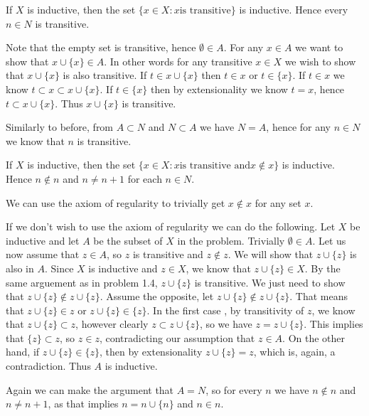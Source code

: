 \begin{problem}
  If $X$ is inductive, then the set $\{x \in X : x \text{is transitive}\}$ is inductive.
  Hence every $n \in N$ is transitive.
\end{problem}

\begin{solution}
  Note that the empty set is transitive, hence $\emptyset \in A$.
  For any $x \in A$ we want to show that $x \cup \{x\} \in A$.
  In other words for any transitive $x \in X$ we wish to show that $x \cup \{x\}$ is also transitive.
  If $t \in x \cup \{x\}$ then $t \in x$ or $t \in \{x\}$.
  If $t \in x$ we know $t \subset x \subset x \cup \{x\}$.
  If $t \in \{x\}$ then by extensionality we know $t = x$, hence $t \subset x \cup \{x\}$.
  Thus $x \cup \{x\}$ is transitive.

  Similarly to before, from $A \subset N$ and $N \subset A$ we have $N = A$, hence for any $n \in N$ we know that $n$ is transitive.
\end{solution}

\begin{problem}
  If $X$ is inductive, then the set $\{x \in X : x \text{is transitive and} x \notin x\}$ is inductive.
  Hence $n \notin n$ and $n \neq n + 1$ for each $n \in N$.
\end{problem}

\begin{solution}
  We can use the axiom of regularity to trivially get $x \notin x$ for any set $x$.

  If we don't wish to use the axiom of regularity we can do the following.
  Let $X$ be inductive and let $A$ be the subset of $X$ in the problem.
  Trivially $\emptyset \in A$.
  Let us now assume that $z \in A$, so $z$ is transitive and $z \notin z$.
  We will show that $z \cup \{z\}$ is also in $A$.
  Since $X$ is inductive and $z \in X$, we know that $z \cup \{z\} \in X$.
  By the same arguement as in problem 1.4, $z \cup \{z\}$ is transitive.
  We just need to show that $z \cup \{z\} \notin z \cup \{z\}$.
  Assume the opposite, let $z \cup \{z\} \notin z \cup \{z\}$.
  That means that $z \cup \{z\} \in z$ or $z \cup \{z\} \in \{z\}$.
  In the first case , by transitivity of $z$, we know that $z \cup \{z\} \subset z$, however clearly $z \subset z \cup \{z\}$, so we have $z = z \cup \{z\}$.
  This implies that $\{z\} \subset z$, so $z \in z$, contradicting our assumption that $z \in A$.
  On the other hand, if $z \cup \{z\} \in \{z\}$, then by extensionality $z \cup \{z\} = z$, which is, again, a contradiction.
  Thus $A$ is inductive.

  Again we can make the argument that $A = N$, so for every $n$ we have $n \notin n$ and $n \neq n + 1$, as that implies $n = n \cup \{n\}$ and $n \in n$.
\end{solution}


